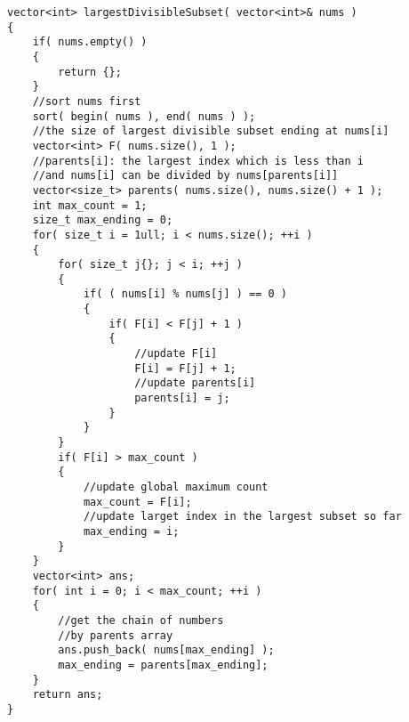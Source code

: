 \setcounter{lstlisting}{0}
\begin{lstlisting}[style=customc, caption={Dynamic Programming}]
vector<int> largestDivisibleSubset( vector<int>& nums )
{
    if( nums.empty() )
    {
        return {};
    }
    //sort nums first
    sort( begin( nums ), end( nums ) );
    //the size of largest divisible subset ending at nums[i]
    vector<int> F( nums.size(), 1 );
    //parents[i]: the largest index which is less than i
    //and nums[i] can be divided by nums[parents[i]]
    vector<size_t> parents( nums.size(), nums.size() + 1 );
    int max_count = 1;
    size_t max_ending = 0;
    for( size_t i = 1ull; i < nums.size(); ++i )
    {
        for( size_t j{}; j < i; ++j )
        {
            if( ( nums[i] % nums[j] ) == 0 )
            {
                if( F[i] < F[j] + 1 )
                {
                    //update F[i]
                    F[i] = F[j] + 1;
                    //update parents[i]
                    parents[i] = j;
                }
            }
        }
        if( F[i] > max_count )
        {
            //update global maximum count
            max_count = F[i];
            //update larget index in the largest subset so far
            max_ending = i;
        }
    }
    vector<int> ans;
    for( int i = 0; i < max_count; ++i )
    {
        //get the chain of numbers
        //by parents array
        ans.push_back( nums[max_ending] );
        max_ending = parents[max_ending];
    }
    return ans;
}
\end{lstlisting}